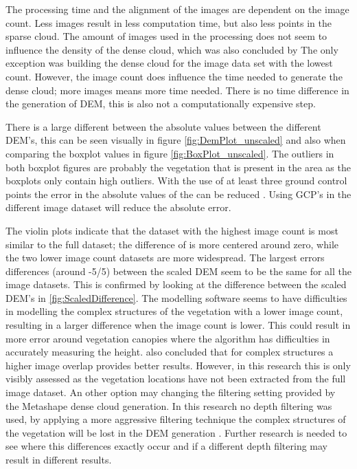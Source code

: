 \documentclass{isprs} %
\begin{document}
The processing time and the alignment of the images are dependent on the image count.
Less images result in less computation time, but also less points in the sparse cloud.
The amount of images used in the processing does not seem to influence the density of the dense cloud, which was also concluded by \citet{EffectofUABimgcamover} 
The only exception was building the dense cloud for the image data set with the lowest count. 
However, the image count does influence the time needed to generate the dense cloud; more images means more time needed.
There is no time difference in the generation of DEM, this is also not a computationally expensive step.

There is a large different between the absolute values between the different DEM's, this can be seen visually in figure \ref{fig:DemPlot_unscaled} and also when comparing the boxplot values in figure \ref{fig:BoxPlot_unscaled}.
The outliers in both boxplot figures are probably the vegetation that is present in the area as the boxplots only contain high outliers.
With the use of at least three ground control points the error in the absolute values of the can be reduced \citep{AssessingUAVGCPS, GCPbetterAccuracy, GeoreferencedPointClouds}.
Using GCP's in the different image dataset will reduce the absolute error.

The violin plots indicate that the dataset with the highest image count is most similar to the full dataset; the difference of is more centered around zero, while the two lower image count datasets are more widespread.
The largest errors differences (around -5/5) between the scaled DEM seem to be the same for all the image datasets.
This is confirmed by looking at the difference between the scaled DEM's in \ref{fig:ScaledDifference}.
The modelling software seems to have difficulties in modelling the complex structures of the vegetation with a lower image count, resulting in a larger difference when the image count is lower.
This could result in more error around vegetation canopies where the algorithm has difficulties in accurately measuring the height. 
\citet{AccessingImageOverlap} also concluded that for complex structures a higher image overlap provides better results. 
However, in this research this is only visibly assessed as the vegetation locations have not been extracted from the full image dataset.
An other option may changing the filtering setting provided by the Metashape dense cloud generation.
In this research no depth filtering was used, by applying a more aggressive filtering technique the complex structures of the vegetation will be lost in the DEM generation \citep{AgisoftMetashape}.
Further research is needed to see where this differences exactly occur and if a different depth filtering may result in different results.
\end{document}
